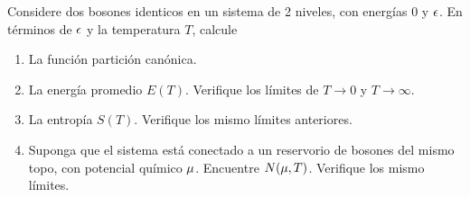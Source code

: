 \begin{ej}
	Considere dos bosones identicos en un sistema de 2 niveles, con energías $0$ y $\epsilon$. En términos de $\epsilon$ y la temperatura $T$, calcule
	\begin{enumerate}
		\item La función partición canónica.
		\item La energía promedio $E(T)$. Verifique los límites de $T\to 0$ y $T\to\infty$.
		\item La entropía $S(T)$. Verifique los mismo límites anteriores.
		\item Suponga que el sistema está conectado a un reservorio de bosones del mismo topo, con potencial químico $\mu$. Encuentre $N(\mu ,T)$. Verifique los mismo límites.
	\end{enumerate}
\end{ej}

